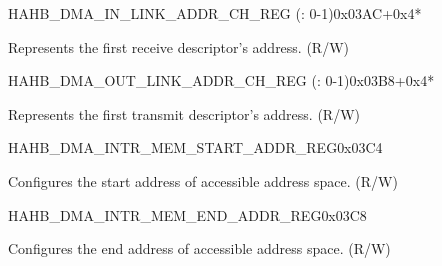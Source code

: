 \begin{register}{H}{AHB\_DMA\_IN\_LINK\_ADDR\_CH\_REG (: 0-1)}{0x03AC+0x4*}\label{regdesc:AHBDMAINLINKADDRCHNREG}
%
\regnewline%
\begin{regdesc}\begin{reglist}
\label{fielddesc:AHBDMAINLINKADDRCHN}\item [AHB\_DMA\_INLINK\_ADDR\_CH\regindex{n}] Represents the first receive descriptor's address. (R/W)
\end{reglist}\end{regdesc}
\end{register}


\begin{register}{H}{AHB\_DMA\_OUT\_LINK\_ADDR\_CH\_REG (: 0-1)}{0x03B8+0x4*}\label{regdesc:AHBDMAOUTLINKADDRCHNREG}
%
\regnewline%
\begin{regdesc}\begin{reglist}
\label{fielddesc:AHBDMAOUTLINKADDRCHN}\item [AHB\_DMA\_OUTLINK\_ADDR\_CH\regindex{n}] Represents the first transmit descriptor's address. (R/W)
\end{reglist}\end{regdesc}
\end{register}


\begin{register}{H}{AHB\_DMA\_INTR\_MEM\_START\_ADDR\_REG}{0x03C4}\label{regdesc:AHBDMAINTRMEMSTARTADDRREG}
%
\regnewline%
\begin{regdesc}\begin{reglist}
\label{fielddesc:AHBDMAACCESSINTRMEMSTARTADDR}\item [AHB\_DMA\_ACCESS\_INTR\_MEM\_START\_ADDR] Configures the start address of accessible address space. (R/W)
\end{reglist}\end{regdesc}
\end{register}


\begin{register}{H}{AHB\_DMA\_INTR\_MEM\_END\_ADDR\_REG}{0x03C8}\label{regdesc:AHBDMAINTRMEMENDADDRREG}
%
\regnewline%
\begin{regdesc}\begin{reglist}
\label{fielddesc:AHBDMAACCESSINTRMEMENDADDR}\item [AHB\_DMA\_ACCESS\_INTR\_MEM\_END\_ADDR] Configures the end address of accessible address space. (R/W)
\end{reglist}\end{regdesc}
\end{register}


